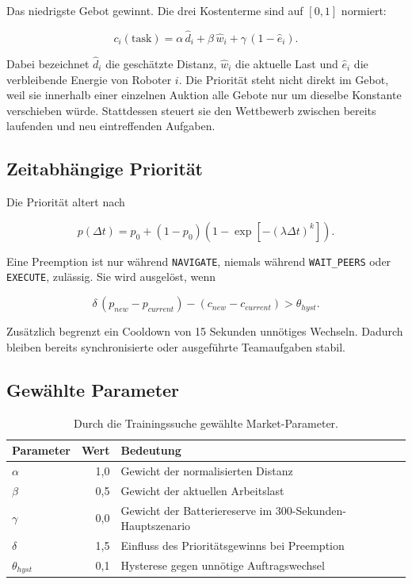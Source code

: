 \documentclass[11pt,a4paper]{article}
\begin{document}
Das niedrigste Gebot gewinnt. Die drei Kostenterme sind auf $[0,1]$ normiert:

\begin{equation}
  c_i(\mathrm{task}) = \alpha\,\hat d_i + \beta\,\hat w_i
  + \gamma\,(1-\hat e_i).
\end{equation}

Dabei bezeichnet $\hat d_i$ die geschätzte Distanz, $\hat w_i$ die aktuelle Last und
$\hat e_i$ die verbleibende Energie von Roboter $i$. Die Priorität steht nicht direkt im
Gebot, weil sie innerhalb einer einzelnen Auktion alle Gebote nur um dieselbe Konstante
verschieben würde. Stattdessen steuert sie den Wettbewerb zwischen bereits laufenden und
neu eintreffenden Aufgaben.

\subsection{Zeitabhängige Priorität}

Die Priorität altert nach

\begin{equation}
  p(\Delta t)=p_0+(1-p_0)\left(1-\exp\left[-(\lambda\Delta t)^k\right]\right).
\end{equation}

Eine Preemption ist nur während \texttt{NAVIGATE}, niemals während
\texttt{WAIT\_PEERS} oder \texttt{EXECUTE}, zulässig. Sie wird ausgelöst, wenn

\begin{equation}
  \delta\,(p_{new}-p_{current})-(c_{new}-c_{current})>\theta_{hyst}.
\end{equation}

Zusätzlich begrenzt ein Cooldown von 15 Sekunden unnötiges Wechseln. Dadurch bleiben
bereits synchronisierte oder ausgeführte Teamaufgaben stabil.

\subsection{Gewählte Parameter}

\begin{table}[H]
\centering
\begin{tabularx}{0.88\textwidth}{@{}l r X@{}}
\toprule
Parameter & Wert & Bedeutung\\
\midrule
$\alpha$ & 1,0 & Gewicht der normalisierten Distanz\\
$\beta$ & 0,5 & Gewicht der aktuellen Arbeitslast\\
$\gamma$ & 0,0 & Gewicht der Batteriereserve im 300-Sekunden-Hauptszenario\\
$\delta$ & 1,5 & Einfluss des Prioritätsgewinns bei Preemption\\
$\theta_{hyst}$ & 0,1 & Hysterese gegen unnötige Auftragswechsel\\
\bottomrule
\end{tabularx}
\caption{Durch die Trainingssuche gewählte Market-Parameter.}
\end{table}
\end{document}
